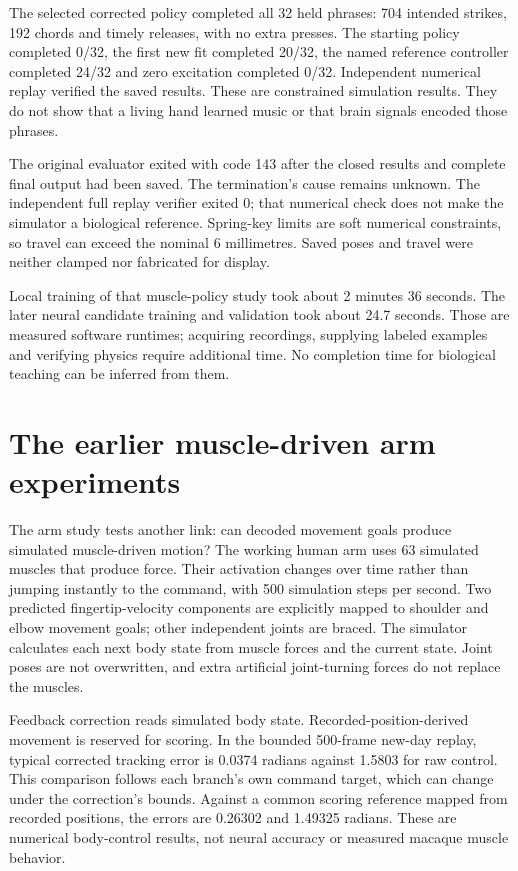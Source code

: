 The selected corrected policy completed all 32 held phrases: 704 intended
strikes, 192 chords and timely releases, with no extra presses. The starting
policy completed 0/32, the first new fit completed 20/32, the named reference
controller completed 24/32 and zero excitation completed 0/32. Independent
numerical replay verified the saved results. These are constrained simulation
results. They do not show that a living hand learned music or that brain signals
encoded those phrases.

The original evaluator exited with code 143 after the closed results and complete final output had been saved. The termination's cause remains unknown. The independent full replay verifier exited 0; that numerical check does not make the simulator a biological reference. Spring-key limits are soft numerical constraints, so travel can exceed the nominal 6 millimetres. Saved poses and travel were neither clamped nor fabricated for display.

Local training of that muscle-policy study took about 2 minutes 36 seconds.
The later neural candidate training and validation took about 24.7 seconds.
Those are measured software runtimes; acquiring recordings, supplying labeled
examples and verifying physics require additional time. No completion time for
biological teaching can be inferred from them.



\section{The earlier muscle-driven arm experiments}

The arm study tests another link: can decoded movement goals produce simulated muscle-driven motion? The working human arm uses 63 simulated muscles that produce force. Their
activation changes over time rather than jumping instantly to the command,
with 500 simulation steps per second. Two predicted fingertip-velocity components are explicitly
mapped to shoulder and elbow movement goals; other independent joints are
braced. The simulator calculates each next body state from muscle forces and
the current state. Joint poses are not overwritten, and extra artificial
joint-turning forces do not replace the muscles.
\citep{mujoco2012,myosuite2022,myosim2026}

Feedback correction reads simulated body state. Recorded-position-derived
movement is reserved for scoring. In the bounded 500-frame new-day replay,
typical corrected tracking error is 0.0374 radians against 1.5803 for raw
control. This comparison follows each branch's own command target, which can
change under the correction's bounds. Against a common scoring reference
mapped from recorded positions, the errors are 0.26302 and 1.49325 radians.
These are numerical body-control results, not neural accuracy or measured
macaque muscle behavior.

